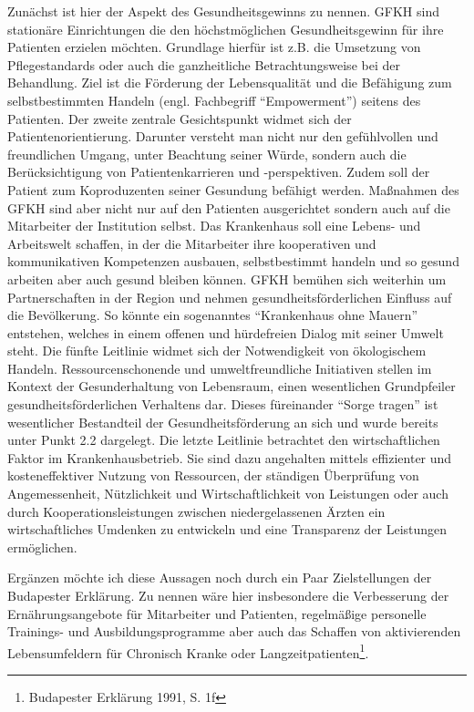 Zunächst ist hier der Aspekt des Gesundheitsgewinns zu nennen. GFKH sind stationäre Einrichtungen die den höchstmöglichen Gesundheitsgewinn für ihre Patienten erzielen möchten. Grundlage hierfür ist z.B. die Umsetzung von Pflegestandards oder auch die ganzheitliche Betrachtungsweise bei der Behandlung. Ziel ist die Förderung der Lebensqualität und die Befähigung zum selbstbestimmten Handeln (engl. Fachbegriff "`Empowerment"') seitens des Patienten. Der zweite zentrale Gesichtspunkt widmet sich der Patientenorientierung. Darunter versteht man nicht nur den gefühlvollen und freundlichen Umgang, unter Beachtung seiner Würde, sondern auch die Berücksichtigung von Patientenkarrieren und -perspektiven. Zudem soll der Patient zum Koproduzenten seiner Gesundung befähigt werden. Maßnahmen des GFKH sind aber nicht nur auf den Patienten ausgerichtet sondern auch auf die Mitarbeiter der Institution selbst. Das Krankenhaus soll eine Lebens- und Arbeitswelt schaffen, in der die Mitarbeiter ihre kooperativen und kommunikativen Kompetenzen ausbauen, selbstbestimmt handeln und so gesund arbeiten aber auch gesund bleiben können. GFKH bemühen sich weiterhin um Partnerschaften in der Region und nehmen gesundheitsförderlichen Einfluss auf die Bevölkerung. So könnte ein sogenanntes "`Krankenhaus ohne Mauern"' entstehen, welches in einem offenen und hürdefreien Dialog mit seiner Umwelt steht. Die fünfte Leitlinie widmet sich der Notwendigkeit von ökologischem Handeln. Ressourcenschonende und umweltfreundliche Initiativen stellen im Kontext der Gesunderhaltung von Lebensraum, einen wesentlichen Grundpfeiler gesundheitsförderlichen Verhaltens dar. Dieses füreinander "`Sorge tragen"' ist wesentlicher Bestandteil der Gesundheitsförderung an sich und wurde bereits unter Punkt 2.2 dargelegt. Die letzte Leitlinie betrachtet den wirtschaftlichen Faktor im Krankenhausbetrieb. Sie sind dazu angehalten mittels effizienter und kosteneffektiver Nutzung von Ressourcen, der ständigen Überprüfung von Angemessenheit, Nützlichkeit und Wirtschaftlichkeit von Leistungen oder auch durch Kooperationsleistungen zwischen niedergelassenen Ärzten ein wirtschaftliches Umdenken zu entwickeln und eine Transparenz der Leistungen ermöglichen.

Ergänzen möchte ich diese Aussagen noch durch ein Paar Zielstellungen der Budapester Erklärung. Zu nennen wäre hier insbesondere die Verbesserung der Ernährungsangebote für Mitarbeiter und Patienten, regelmäßige personelle Trainings- und Ausbildungsprogramme aber auch das Schaffen von aktivierenden Lebensumfeldern für Chronisch Kranke oder Langzeitpatienten\footnote{Budapester Erklärung 1991, S. 1f}.


